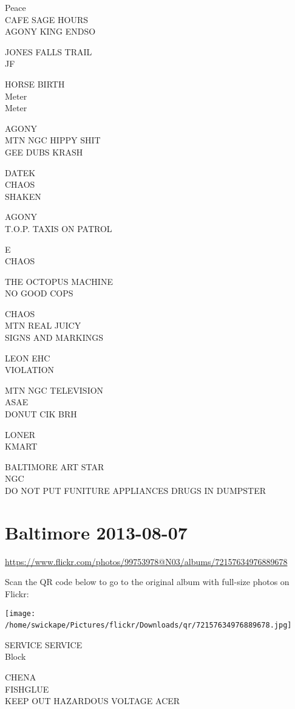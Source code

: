 \documentclass[10pt,letterpaper]{article}
\begin{document}
Peace\\
CAFE SAGE HOURS\\
AGONY KING ENDSO

JONES FALLS TRAIL\\
JF

HORSE BIRTH\\
Meter\\
Meter

AGONY\\
MTN NGC HIPPY SHIT\\
GEE DUBS KRASH

DATEK\\
CHAOS\\
SHAKEN

AGONY\\
T.O.P. TAXIS ON PATROL

E\\
CHAOS

THE OCTOPUS MACHINE\\
NO GOOD COPS

CHAOS\\
MTN REAL JUICY\\
SIGNS AND MARKINGS

LEON EHC\\
VIOLATION

MTN NGC TELEVISION\\
ASAE\\
DONUT CIK BRH

LONER\\
KMART

BALTIMORE ART STAR\\
NGC\\
DO NOT PUT FUNITURE APPLIANCES DRUGS IN DUMPSTER
\

\section*{Baltimore 2013-08-07}

\url{https://www.flickr.com/photos/99753978@N03/albums/72157634976889678}

Scan the QR code below to go to the original album with full-size photos on Flickr:

\texttt{[image: /home/swickape/Pictures/flickr/Downloads/qr/72157634976889678.jpg]}
\

SERVICE SERVICE\\
Block

CHENA\\
FISHGLUE\\
KEEP OUT HAZARDOUS VOLTAGE ACER
\end{document}
